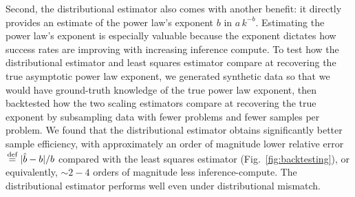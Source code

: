 Second, the distributional estimator also comes with another benefit: it directly provides an estimate of the power law's exponent $b$ in $a \, k^{-b}$. Estimating the power law's exponent is especially valuable because the exponent dictates how success rates are improving with increasing inference compute. To test how the distributional estimator and least squares estimator compare at recovering the true asymptotic power law exponent, we generated synthetic data so that we would have ground-truth knowledge of the true power law exponent, then backtested how the two scaling estimators compare at recovering the true exponent \citep{alabdulmohsin2022revisitingneuralscalinglaws, owen2024predicting} by subsampling data with fewer problems and fewer samples per problem.
We found that the distributional estimator obtains significantly better sample efficiency, with approximately an order of magnitude lower relative error $\operatorname{\stackrel{\text{def}}{\;=\;}} |\hat{b} - b| / b$ compared with the least squares estimator (Fig.~\ref{fig:backtesting}), or equivalently, ${\sim}2-4$ orders of magnitude less inference-compute. The distributional estimator performs well even under distributional mismatch.